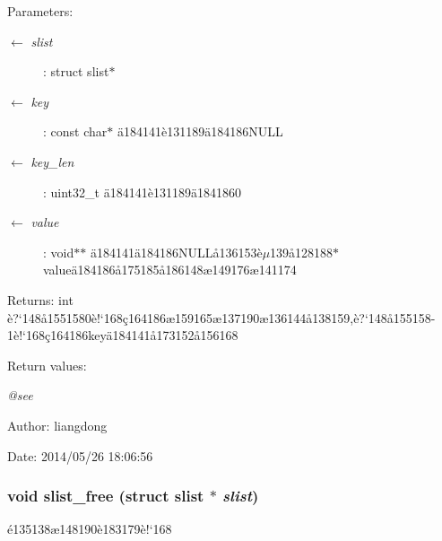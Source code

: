 \begin{Desc}
\item[Parameters:]
\begin{description}
\item[\mbox{$\leftarrow$} {\em slist}]: struct slist$\ast$ \item[\mbox{$\leftarrow$} {\em key}]: const char$\ast$ \"{a}184141\`{e}131189\"{a}184186NULL \item[\mbox{$\leftarrow$} {\em key\_\-len}]: uint32\_\-t \"{a}184141\`{e}131189\"{a}1841860 \item[\mbox{$\leftarrow$} {\em value}]: void$\ast$$\ast$ \"{a}184141\"{a}184186NULL\aa{}136153\`{e}$\mu$139\aa{}128188$\ast$value\"{a}184186\aa{}175185\aa{}186148\ae{}149176\ae{}141174 \end{description}
\end{Desc}
\begin{Desc}
\item[Returns:]int \`{e}?`148\aa{}1551580\`{e}!`168\c{c}164186\ae{}159165\ae{}137190\ae{}136144\aa{}138159,\`{e}?`148\aa{}155158-1\`{e}!`168\c{c}164186key\"{a}184141\aa{}173152\aa{}156168 \end{Desc}
\begin{Desc}
\item[Return values:]
\begin{description}
\item[{\em @see}]\end{description}
\end{Desc}
\begin{Desc}
\item[Author:]liangdong \end{Desc}
\begin{Desc}
\item[Date:]2014/05/26 18:06:56 \end{Desc}
\subsubsection{\setlength{\rightskip}{0pt plus 5cm}void slist\_\-free (struct slist $\ast$ {\em slist})}\label{slist_8c_a3}


\'{e}135138\ae{}148190\`{e}183179\`{e}!`168 


